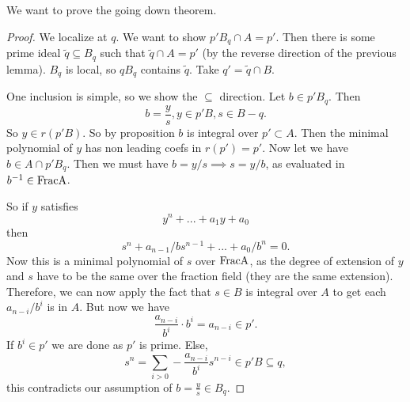 \section{}








We want to prove the going down theorem.




\begin{proof}
    We localize at $q$. We want to show $p'B_q\cap A=p'$. Then there is some prime ideal $\tilde{q}\subseteq B_q$ such that $\tilde{q}\cap A= p'$ (by the reverse direction of the previous lemma). $B_q$ is local, so $qB_q$ contains $\tilde{q}$. Take $q'=\tilde{q}\cap B$.

    One inclusion is simple, so we show the $\subseteq $ direction. Let $b\in p'B_q$. Then \[
    b=\frac{y}{s}, y\in p'B, s\in B-q.
    \]
    So $y\in r(p'B)$. So by proposition $b$ is integral over $p'\subset A$. Then the minimal polynomial of $y$ has non leading coefs in $r(p')=p'$. Now let we have $b\in A\cap p'B_q$. Then we must have $b=y/s\implies s=y/b$, as evaluated in $b^{-1}\in \rm{Frac}A$.

    So if $y$ satisfies \[
    y^n+ ...+a_1y+a_0
    \]
    then \[
    s^n+a_{n-1}/b s^{n-1}+...+a_0/b^n=0.
    \]
    Now this is a minimal polynomial of $s$ over $\rm{Frac}A$, as the degree of extension of $y$ and $s$ have to be the same over the fraction field (they are the same extension). Therefore, we can now apply the fact that $s\in B$ is integral over $A$ to get each $a_{n-i}/b^i$ is in $A$. But now we have \[
    \frac{a_{n-i}}{b^i}\cdot b^i = a_{n-i} \in p'.
    \] 
    If $b^i\in p'$ we are done as $p'$ is prime. Else, \[
    s^n = \sum_{i>0}-\frac{a_{n-i}}{b^i} s^{n-i} \in p'B\subseteq q,
    \]
    this contradicts our assumption of $b=\frac{y}{s}\in B_q$.
\end{proof}



